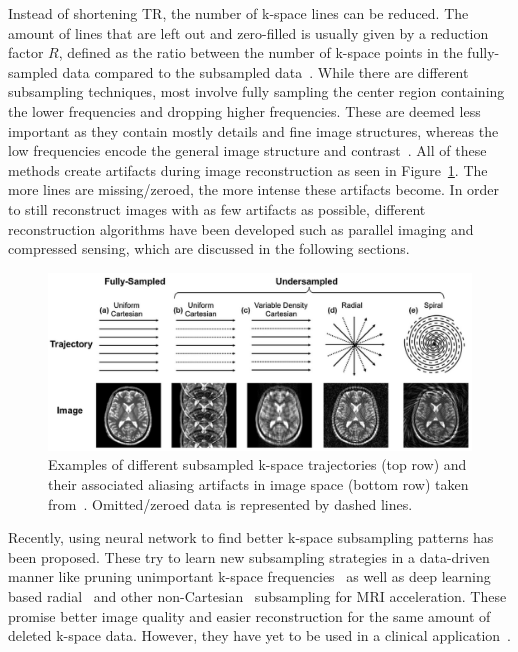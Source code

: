 Instead of shortening TR, the number of k-space lines can be reduced. The amount of lines that are left out and zero-filled is usually given by a reduction factor $R$, defined as the ratio between the number of k-space points in the fully-sampled data compared to the subsampled data~\cite{AdvancesPI,ParallelMRI}. While there are different subsampling techniques, most involve fully sampling the center region containing the lower frequencies and dropping higher frequencies. These are deemed less important as they contain mostly details and fine image structures, whereas the low frequencies encode the general image structure and contrast~\cite{SamplingStrategies}. All of these methods create artifacts during image reconstruction as seen in Figure~\ref{fig:ExamplesSubsampling}. The more lines are missing/zeroed, the more intense these artifacts become. In order to still reconstruct images with as few artifacts as possible, different reconstruction algorithms have been developed such as parallel imaging and compressed sensing, which are discussed in the following sections.

\begin{figure}[h] %
	\centering
	\graphicspath{{images/}{\main/images/}}
	\includegraphics[width=\linewidth]{ExamplesSubsampling.png} 
	\caption{Examples of different subsampled k-space trajectories (top row) and their associated aliasing artifacts in image space (bottom row) taken from~\cite{AdvancesPI}. Omitted/zeroed data is represented by dashed lines.}
	\label{fig:ExamplesSubsampling}
\end{figure}

\noindent Recently, using neural network to find better k-space subsampling patterns has been proposed. These try to learn new subsampling strategies in a data-driven manner like pruning unimportant k-space frequencies~\cite{MRISubsamplingPruning} as well as deep learning based radial~\cite{DeepMRIReconstructionRadialSubsampling} and other non-Cartesian~\cite{DeepMRIReconstructionSubsampling} subsampling for MRI acceleration. These promise better image quality and easier reconstruction for the same amount of deleted k-space data. However, they have yet to be used in a clinical application~\cite{MRISubsamplingPruning}.


